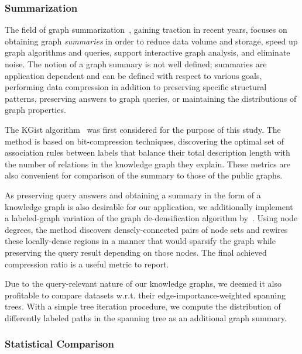 \subsubsection{Summarization}

The field of graph summarization~\cite{liu_graph_2019}, gaining traction in recent years, focuses on obtaining graph \emph{summaries} in order to reduce data volume and storage, speed up graph algorithms and queries, support interactive graph analysis, and eliminate noise. The notion of a graph summary is not well defined; summaries are application dependent and can be defined with respect to various goals, performing data compression in addition to preserving specific structural patterns, preserving answers to graph queries, or maintaining the distributions of graph properties. 

The KGist algorithm~\cite{belth_what_2020} was first considered for the purpose of this study. The method is based on bit-compression techniques, discovering the optimal set of association rules between labels that balance their total description length with the number of relations in the knowledge graph they explain. These metrics are also convenient for comparison of the summary to those of the public graphs.

As preserving query answers and obtaining a summary in the form of a knowledge graph is also desirable for our application, we additionally implement a labeled-graph variation of the graph de-densification algorithm by~\cite{maccioni_scalable_2016}. Using node degrees, the method discovers densely-connected pairs of node sets and rewires these locally-dense regions in a manner that would sparsify the graph while preserving the query result depending on those nodes. The final achieved compression ratio is a useful metric to report. 

Due to the query-relevant nature of our knowledge graphs, we deemed it also profitable to compare datasets w.r.t. their edge-importance-weighted spanning trees. With a simple tree iteration procedure, we compute the distribution of differently labeled paths in the spanning tree as an additional graph summary.

\subsubsection{Statistical Comparison}

